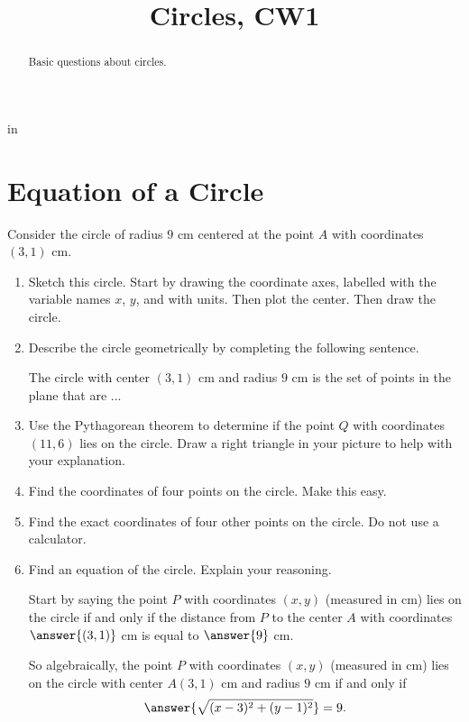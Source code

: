 \documentclass{ximera}
\title{Circles, CW1}
\newcommand{\pskip}{\vskip 0.1 in}
\begin{document}
\begin{abstract}
Basic questions about circles.
\end{abstract}
\maketitle


\pskip

\section{Equation of a Circle}

\begin{question} \label{QDEWWD3w339832}

Consider the circle of radius $9$ cm centered at the point $A$ with coordinates $(3,1)$ cm.

\begin{enumerate}
\item Sketch this circle. Start by drawing the coordinate axes, labelled with the variable names $x$, $y$, and with units. Then plot the center. Then draw the circle.

\item Describe the circle geometrically by completing the following sentence.

The circle with center $(3,1)$ cm and radius $9$ cm is the set of points in the plane that are ... 
\begin{freeResponse}
\end{freeResponse}

\item Use the Pythagorean theorem to determine if the point $Q$ with coordinates $(11,6)$ lies on the circle. Draw a right triangle in your picture to help with your explanation.

\item Find the coordinates of four points on the circle. Make this easy.

\item Find the exact coordinates of four other points on the circle. Do not use a calculator.

\item Find an equation of the circle. Explain your reasoning. 

Start by saying the point $P$ with coordinates $(x,y)$ (measured in cm) lies on the circle if and only if the distance from $P$ to the center $A$ with coordinates $\answer{(3,1)}$ cm is equal to $\answer{9}$ cm.

So algebraically, the point $P$ with coordinates $(x,y)$ (measured in cm) lies on the circle with center $A(3,1)$ cm and radius $9$ cm if and only if
\[
     \answer{\sqrt{(x-3)^2 + (y-1)^2}}  = 9 .
\] 

\end{enumerate}
\end{question}
\end{document}
